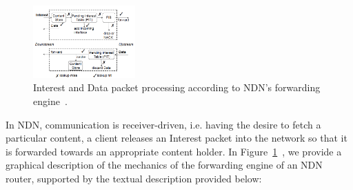 \begin{figure}[h!]

    \centering
    \includegraphics[width=0.35\textwidth]{figures/ndn-forwarding-engine.png}
    \cprotect\caption{Interest and Data packet processing according to NDN's 
        forwarding engine~\cite{Yi2012}.}
    \label{fig:ccn-icn-ndn-forwarding-engine}

\end{figure}

In NDN, communication is receiver-driven, i.e. having the desire to fetch 
a particular content, a client releases an Interest packet into the network 
so that it is forwarded towards an appropriate content holder. In 
Figure~\ref{fig:ccn-icn-ndn-forwarding-engine}~\cite{Yi2012}, we provide a 
graphical description 
of the mechanics of the forwarding engine of an NDN router, supported by 
the textual description provided below:

